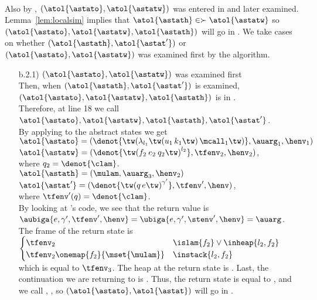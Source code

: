 \documentclass{LMCS}
\theoremstyle{definition} \newtheorem{property}[thm]{Property}
\begin{document}
\begin{enumerate}[$\bullet$]
\begin{enumerate}[$\bullet$]
    \\
    Also by \ih{}, $(\atol{\astato}, \atol{\astatw})$ was entered in \work{}
    and later examined.
    Lemma~\ref{lem:localsim} implies that 
    $\atol{\astath} \in \succ{\atol{\astatw}}$ so
    $(\atol{\astato}, \atol{\astatw}, \atol{\astath})$ will go in \callers.
    We take cases on whether $(\atol{\astath}, \atol{\astat'})$ or
    $(\atol{\astato}, \atol{\astatw})$ was examined first by the algorithm.
    \begin{enumerate}[$\bullet$]
    \item[b.2.1)]
      $(\atol{\astato}, \atol{\astatw})$ was examined first \\
      Then, when $(\atol{\astath}, \atol{\astat'})$ is examined, 
      $(\atol{\astato}, \atol{\astatw}, \atol{\astath})$ is in \callers. \\
      Therefore, at line 18 we call 
      $\atol{\astato}, \atol{\astatw}, \atol{\astath}, 
      \atol{\astat'}$\tw{)}. \\
      By applying \atol{\cdot} to the abstract states we get \\
      $\atol{\astato} = (\denot{\ulamone}, \auarg_1, \henv_1)$ \\
      $\atol{\astatw} = (\denot{\ucalltwo}, \tfenv_2, \henv_2)$, \\
      where $q_2 = \denot{\clam}$. \\
      $\atol{\astath} = (\mulam, \auarg_3, \henv_2)$ \\
      $\atol{\astat'} = (\denot{\qcallp}, \tfenv', \henv)$, \\
      where $\tfenv'(q) = \denot{\clam}$. \\
      By looking at 's code, we see that the return value is 
      $\aubiga{e, \gamma', \tfenv', \henv} = \ubiga{e, \gamma', \stenv', \henv}
      = \auarg$.
      The frame of the return state is \\
      $\begin{cases}
        \tfenv_2 & \islam{f_2} \lor \inheap{l_2, f_2} \\
        \tfenv_2\onemap{f_2}{\mset{\mulam}} & \instack{l_2, f_2}
      \end{cases}$ \\
      which is equal to $\tfenv_3$.
      The heap at the return state is \henv.
      Last, the continuation we are returning to is \denot{\clam}.
      Thus, the return state \lstat{} is equal to \atol{\astat},
      and we call \atol{\astato}, \atol{\astat}\tw{)},
      so $(\atol{\astato}, \atol{\astat})$ will go in \seen.

\end{enumerate}
\end{enumerate}
\end{enumerate}
\end{document}

